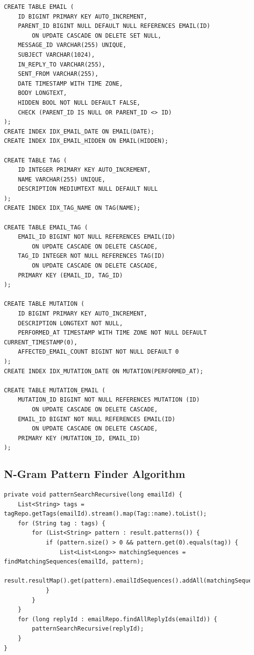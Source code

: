 \documentclass[a4paper, 12pt]{article}
\begin{document}
		\begin{verbatim}
CREATE TABLE EMAIL (
	ID BIGINT PRIMARY KEY AUTO_INCREMENT,
	PARENT_ID BIGINT NULL DEFAULT NULL REFERENCES EMAIL(ID)
		ON UPDATE CASCADE ON DELETE SET NULL,
	MESSAGE_ID VARCHAR(255) UNIQUE,
	SUBJECT VARCHAR(1024),
	IN_REPLY_TO VARCHAR(255),
	SENT_FROM VARCHAR(255),
	DATE TIMESTAMP WITH TIME ZONE,
	BODY LONGTEXT,
	HIDDEN BOOL NOT NULL DEFAULT FALSE,
	CHECK (PARENT_ID IS NULL OR PARENT_ID <> ID)
);
CREATE INDEX IDX_EMAIL_DATE ON EMAIL(DATE);
CREATE INDEX IDX_EMAIL_HIDDEN ON EMAIL(HIDDEN);

CREATE TABLE TAG (
	ID INTEGER PRIMARY KEY AUTO_INCREMENT,
	NAME VARCHAR(255) UNIQUE,
	DESCRIPTION MEDIUMTEXT NULL DEFAULT NULL
);
CREATE INDEX IDX_TAG_NAME ON TAG(NAME);

CREATE TABLE EMAIL_TAG (
	EMAIL_ID BIGINT NOT NULL REFERENCES EMAIL(ID)
		ON UPDATE CASCADE ON DELETE CASCADE,
	TAG_ID INTEGER NOT NULL REFERENCES TAG(ID)
		ON UPDATE CASCADE ON DELETE CASCADE,
	PRIMARY KEY (EMAIL_ID, TAG_ID)
);

CREATE TABLE MUTATION (
	ID BIGINT PRIMARY KEY AUTO_INCREMENT,
	DESCRIPTION LONGTEXT NOT NULL,
	PERFORMED_AT TIMESTAMP WITH TIME ZONE NOT NULL DEFAULT CURRENT_TIMESTAMP(0),
	AFFECTED_EMAIL_COUNT BIGINT NOT NULL DEFAULT 0
);
CREATE INDEX IDX_MUTATION_DATE ON MUTATION(PERFORMED_AT);

CREATE TABLE MUTATION_EMAIL (
	MUTATION_ID BIGINT NOT NULL REFERENCES MUTATION (ID)
		ON UPDATE CASCADE ON DELETE CASCADE,
	EMAIL_ID BIGINT NOT NULL REFERENCES EMAIL(ID)
		ON UPDATE CASCADE ON DELETE CASCADE,
	PRIMARY KEY (MUTATION_ID, EMAIL_ID)
);
		\end{verbatim}
	
	\newpage
	\subsection{N-Gram Pattern Finder Algorithm}
		\label{sec:pattern-algorithm}
		
		\begin{verbatim}
private void patternSearchRecursive(long emailId) {
	List<String> tags = tagRepo.getTags(emailId).stream().map(Tag::name).toList();
	for (String tag : tags) {
		for (List<String> pattern : result.patterns()) {
			if (pattern.size() > 0 && pattern.get(0).equals(tag)) {
				List<List<Long>> matchingSequences = findMatchingSequences(emailId, pattern);
				result.resultMap().get(pattern).emailIdSequences().addAll(matchingSequences);
			}
		}
	}
	for (long replyId : emailRepo.findAllReplyIds(emailId)) {
		patternSearchRecursive(replyId);
	}
}
		\end{verbatim}
		
\end{document}

